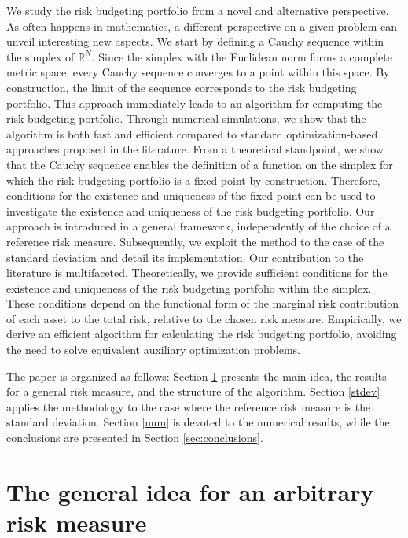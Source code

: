 \documentclass[preprint,11pt,authoryear]{elsarticle}
\begin{document}
We study the risk budgeting portfolio from a novel and alternative perspective. As often happens in mathematics, a different perspective on a given problem can unveil interesting new aspects. We start by defining a Cauchy sequence within the simplex of $\mathbb{R}^N$. Since the simplex with the Euclidean norm forms a complete metric space, every Cauchy sequence converges to a point within this space. By construction, the limit of the sequence corresponds to the risk budgeting portfolio. This approach immediately leads to an algorithm for computing the risk budgeting portfolio. Through numerical simulations, we show that the algorithm is both fast and efficient compared to standard optimization-based approaches proposed in the literature. From a theoretical standpoint, we show that the Cauchy sequence enables the definition of a function on the simplex for which the risk budgeting portfolio is a fixed point by construction. Therefore, conditions for the existence and uniqueness of the fixed point can be used to investigate the existence and uniqueness of the risk budgeting portfolio. Our approach is introduced in a general framework, independently of the choice of a reference risk measure. Subsequently, we exploit the method to the case of the standard deviation and detail its implementation. Our contribution to the literature is multifaceted. Theoretically, we provide sufficient conditions for the existence and uniqueness of the risk budgeting portfolio within the simplex. These conditions depend on the functional form of the marginal risk contribution of each asset to the total risk, relative to the chosen risk measure. Empirically, we derive an efficient algorithm for calculating the risk budgeting portfolio, avoiding the need to solve equivalent auxiliary optimization problems.







The paper is organized as follows: Section \ref{ass} presents the main idea, the results for a general risk measure, and the structure of the algorithm. Section \ref{stdev} applies the methodology to the case where the reference risk measure is the standard deviation. Section \ref{num} is devoted to the numerical results, while the conclusions are presented in Section \ref{sec:conclusions}.

\section{The general idea for an arbitrary risk measure}
\label{ass}
\end{document}
